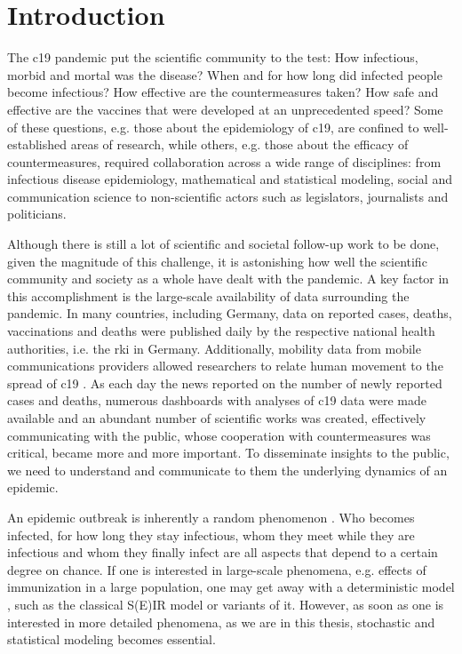 \chapter{Introduction}
\label{cha:introduction}

The \gls{c19} pandemic put the scientific community to the test: How infectious, morbid and mortal was the disease? When and for how long did infected people become infectious? How effective are the countermeasures taken? How safe and effective are the vaccines that were developed at an unprecedented speed? Some of these questions, e.g. those about the epidemiology of \acrshort{c19}, are confined to well-established areas of research, while others, e.g. those about the efficacy of countermeasures, required collaboration across a wide range of disciplines: from infectious disease epidemiology, mathematical and statistical modeling, social and communication science to non-scientific actors such as legislators, journalists and politicians.

Although there is still a lot of scientific and societal follow-up work to be done, given the magnitude of this challenge, it is astonishing how well the scientific community and society as a whole have dealt with the pandemic. A key factor in this accomplishment is the large-scale availability of data surrounding the pandemic. In many countries, including Germany, data on reported cases, deaths, vaccinations and deaths were published daily by the respective national health authorities, i.e. the \gls{rki} \citep{RobertKoch-Institut2022SARSCoV2,RobertKoch-Institut2021COVID19Hospitalisierungen} in Germany. Additionally, mobility data from mobile communications providers allowed researchers to relate human movement to the spread of \acrshort{c19} \citep{Kraemer2020Effect,Schlosser2020COVID19}. 
As each day the news reported on the number of newly reported cases and deaths, numerous dashboards with analyses of \acrshort{c19} data were made available and an abundant number of scientific works was created, effectively communicating with the public, whose cooperation with countermeasures was critical, became more and more important. To disseminate insights to the public, we need to understand and communicate to them the underlying dynamics of an epidemic.

An epidemic outbreak is inherently a random phenomenon \citep{Diekmann2013Mathematical}. Who becomes infected, for how long they stay infectious, whom they meet while they are infectious and whom they finally infect are all aspects that depend to a certain degree on chance. If one is interested in large-scale phenomena, e.g. effects of immunization in a large population, one may get away with a deterministic model \citep{Britton2019Stochastic}, such as the classical S(E)IR model \citep{Kermack1927Contribution} or variants of it. However, as soon as one is interested in more detailed phenomena, as we are in this thesis, stochastic and statistical modeling becomes essential. 

